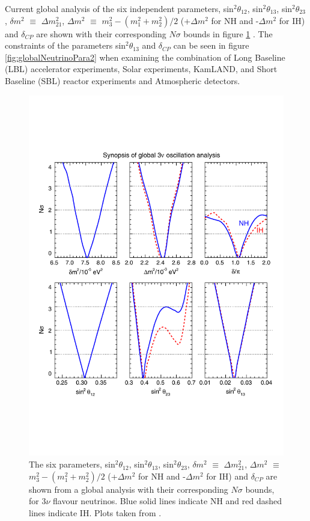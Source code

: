 Current global analysis of the six independent parameters, sin$^{2}\theta_{12}$, sin$^{2}\theta_{13}$, sin$^{2}\theta_{23}$, $\delta m^{2}$ $\equiv$ $\Delta m^{2}_{21}$, $\Delta m^{2}$ $\equiv$ $m_{3}^{2} - (m_{1}^{2} + m_{2}^{2})/2$ (+$\Delta m^{2}$ for NH and -$\Delta m^{2}$ for IH) and $\delta_{CP}$ are shown with their corresponding $N\sigma$ bounds in figure \ref{fig:globalNeutrinoPara1} \cite{fogliNeutrinoPlots}. The constraints of the parameters sin$^{2}\theta_{13}$ and $\delta_{CP}$ can be seen in figure \ref{fig:globalNeutrinoPara2} when examining the combination of Long Baseline (LBL) accelerator experiments, Solar experiments, KamLAND, and Short Baseline (SBL) reactor experiments and Atmospheric detectors. 

\begin{figure}[htbp]
	\begin{center}
		\includegraphics[width=150mm]{Introduction/IntroductionFigs/globalAnalysisNeutrinoPlots1.pdf}
		\caption{The six parameters, sin$^{2}\theta_{12}$, sin$^{2}\theta_{13}$, sin$^{2}\theta_{23}$, $\delta m^{2}$ $\equiv$ $\Delta m^{2}_{21}$, $\Delta m^{2}$ $\equiv$ $m_{3}^{2} - (m_{1}^{2} + m_{2}^{2})/2$ (+$\Delta m^{2}$ for NH and -$\Delta m^{2}$ for IH) and $\delta_{CP}$ are shown from a global analysis with their corresponding $N\sigma$ bounds, for 3$\nu$ flavour neutrinos. Blue solid lines indicate NH and red dashed lines indicate IH. Plots taken from \cite{fogliNeutrinoPlots}.}
		\label{fig:globalNeutrinoPara1}
	\end{center}
\end{figure}
